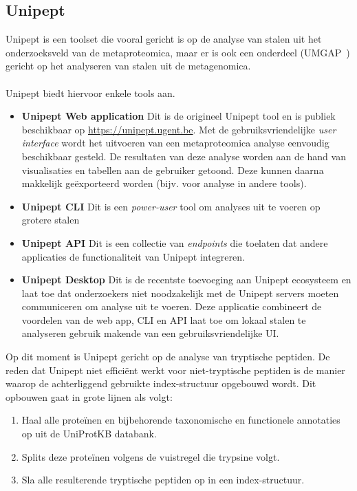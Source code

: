 \documentclass[11pt,dutch,faculty=we,layout=titlefont,underline=false,titleUppercase=true,titleUnderline=true]{ugent2016-report}
\begin{document}
    \subsection{Unipept}\label{subsec:unipept-introductie}
    Unipept is een toolset die vooral gericht is op de analyse van stalen uit het onderzoeksveld van de metaproteomica, maar er is ook een onderdeel (UMGAP~\cite{UMGAP_paper}) gericht op het analyseren van stalen uit de metagenomica.
    \\ \\
    Unipept biedt hiervoor enkele tools aan.
    \begin{itemize}
        \item \textbf{Unipept Web application} Dit is de origineel Unipept tool en is publiek beschikbaar op \url{https://unipept.ugent.be}.
        Met de gebruiksvriendelijke \textit{user interface} wordt het uitvoeren van een metaproteomica analyse eenvoudig beschikbaar gesteld.
        De resultaten van deze analyse worden aan de hand van visualisaties en tabellen aan de gebruiker getoond.
        Deze kunnen daarna makkelijk geëxporteerd worden (bijv. voor analyse in andere tools).
        \item \textbf{Unipept CLI} Dit is een \textit{power-user} tool om analyses uit te voeren op grotere stalen
        \item \textbf{Unipept API} Dit is een collectie van \textit{endpoints} die toelaten dat andere applicaties de functionaliteit van Unipept integreren.
        \item \textbf{Unipept Desktop} Dit is de recentste toevoeging aan Unipept ecosysteem en laat toe dat onderzoekers niet noodzakelijk met de Unipept servers moeten communiceren om analyse uit te voeren.
        Deze applicatie combineert de voordelen van de web app, CLI en API laat toe om lokaal stalen te analyseren gebruik makende van een gebruiksvriendelijke UI\@.

    \end{itemize}

    Op dit moment is Unipept gericht op de analyse van tryptische peptiden.
    De reden dat Unipept niet efficiënt werkt voor niet-tryptische peptiden is de manier waarop de achterliggend gebruikte index-structuur opgebouwd wordt.
    Dit opbouwen gaat in grote lijnen als volgt:

    \begin{enumerate}
        \item Haal alle proteïnen en bijbehorende taxonomische en functionele annotaties op uit de UniProtKB databank.
        \item Splits deze proteïnen volgens de vuistregel die trypsine volgt.
        \item Sla alle resulterende tryptische peptiden op in een index-structuur.
    \end{enumerate}
\end{document}
